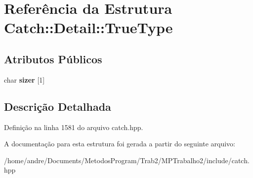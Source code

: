 \hypertarget{structCatch_1_1Detail_1_1TrueType}{}\section{Referência da Estrutura Catch\+:\+:Detail\+:\+:True\+Type}
\label{structCatch_1_1Detail_1_1TrueType}
\subsection*{Atributos Públicos}
\begin{DoxyCompactItemize}
\item 
char {\bfseries sizer} \mbox{[}1\mbox{]}\hypertarget{structCatch_1_1Detail_1_1TrueType_a3aaaeb75909e668b293c8a81f5fb6419}{}\label{structCatch_1_1Detail_1_1TrueType_a3aaaeb75909e668b293c8a81f5fb6419}

\end{DoxyCompactItemize}


\subsection{Descrição Detalhada}


Definição na linha 1581 do arquivo catch.\+hpp.



A documentação para esta estrutura foi gerada a partir do seguinte arquivo\+:\begin{DoxyCompactItemize}
\item 
/home/andre/\+Documents/\+Metodos\+Program/\+Trab2/\+M\+P\+Trabalho2/include/catch.\+hpp\end{DoxyCompactItemize}
